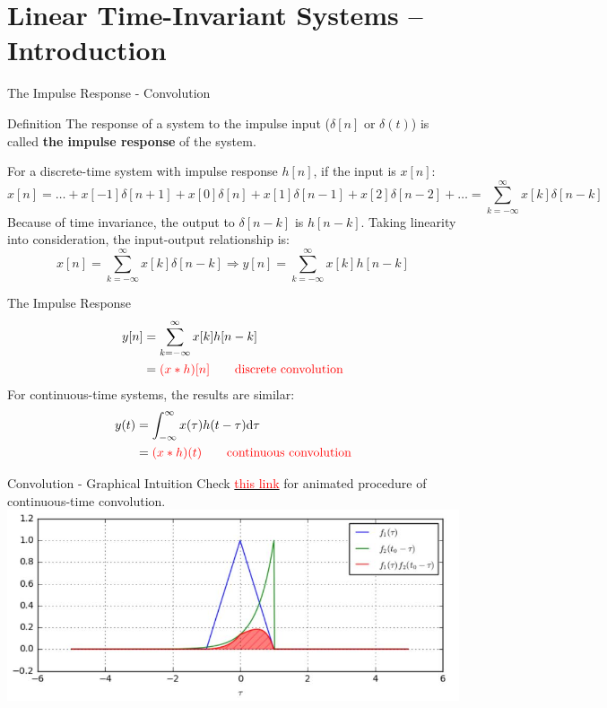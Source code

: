 \documentclass[aspectratio=169]{beamer}
\begin{document}
\section{Linear Time-Invariant Systems -- Introduction} 
\begin{frame}{The Impulse Response - Convolution}
	\begin{block}{Definition}
		The response of a system to the impulse input ($ \delta[n] $ or $ \delta(t) $) is called \textbf{the impulse response} of the system.
	\end{block}
	For a discrete-time system with impulse response $ h[n] $, if the input is $ x[n] $:
	\[x[n] = \dots + x[-1]\delta[n+1] + x[0]\delta[n] + x[1]\delta[n-1] + x[2]\delta[n-2] + \dots = \sum_{k=-\infty}^{\infty}x[k]\delta[n-k]\]
	Because of time invariance, the output to $ \delta[n-k] $ is $ h[n-k] $.
	Taking linearity into consideration, the input-output relationship is:
	\[x[n] = \sum_{k=-\infty}^{\infty}x[k]\delta[n-k] \Rightarrow
	y[n] = \sum_{k=-\infty}^{\infty}x[k]h[n-k] \]
\end{frame}
	
\begin{frame}{The Impulse Response}
	\[\begin{aligned}
	y[n] &= \sum_{k=-\infty}^{\infty}x[k]h[n-k]\\
	&= \textcolor{red}{(x*h)[n]} \quad\quad \textcolor{red}{\text{discrete convolution}}
	\end{aligned}
	 \]
	For continuous-time systems, the results are similar:
	\[\begin{aligned}
	y(t) &= \int_{-\infty}^{\infty}x(\tau)h(t-\tau)\mathrm{d}\tau\\
	&= \textcolor{red}{(x*h)(t)} \quad\quad \textcolor{red}{\text{continuous convolution} }\end{aligned}\]
\end{frame}

\begin{frame}{Convolution - Graphical Intuition}
	Check  \href{https://dspillustrations.com/pages/posts/misc/convolution-examples-and-the-convolution-integral.html}{\textcolor{red}{this link}} for animated procedure of continuous-time convolution.
	\centering
	\includegraphics[scale=.65]{fig01.JPG}
\end{frame}
\end{document}
